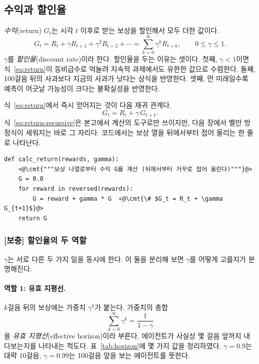 \documentclass[11pt,a4paper]{article}
\newcommand{\cmt}[1]{\textcolor{codecm}{#1}}   %
\begin{document}
\subsection{수익과 할인율}
\label{sec:gamma}

\emph{수익}(return) $G_t$는 시각 $t$ 이후로 받는 보상을 할인해서 모두 더한 값이다.
\begin{equation}
  G_t = R_t + \gamma R_{t+1} + \gamma^2 R_{t+2} + \cdots
      = \sum_{k=0}^{\infty} \gamma^k R_{t+k},
  \qquad 0 \le \gamma \le 1.
  \label{eq:return}
\end{equation}
$\gamma$를 \emph{할인율}(discount rate)이라 한다. 할인율을 두는 이유는 셋이다. 첫째, $\gamma<1$이면
식~\eqref{eq:return}이 등비급수로 억눌려 지속적 과제에서도 유한한 값으로 수렴한다. 둘째, 100걸음 뒤의
사과보다 지금의 사과가 낫다는 상식을 반영한다. 셋째, 먼 미래일수록 예측이 어긋날 가능성이 크다는
불확실성을 반영한다.

식~\eqref{eq:return}에서 즉시 얻어지는 것이 다음 재귀 관계다.
\begin{equation}
  G_t = R_t + \gamma\, G_{t+1}.
  \label{eq:return-recursive}
\end{equation}
식~\eqref{eq:return-recursive}은 본고에서 계산의 도구로만 쓰이지만, 다음 장에서 벨만 방정식이
세워지는 바로 그 자리다. 코드에서는 보상 열을 뒤에서부터 접어 올리는 한 줄로 나타난다.

\begin{lstlisting}[caption={수익의 계산 (\texttt{s01\_mdp.py})},label={lst:return}]
def calc_return(rewards, gamma):
    <@\cmt{"""보상 나열로부터 수익 G를 계산 (뒤에서부터 거꾸로 접어 올린다)"""}@>
    G = 0.0
    for reward in reversed(rewards):
        G = reward + gamma * G  <@\cmt{\# $G_t = R_t + \gamma G_{t+1}$}@>
    return G
\end{lstlisting}

\subsubsection*{[보충] 할인율의 두 역할}

$\gamma$는 서로 다른 두 가지 일을 동시에 한다. 이 둘을 분리해 보면 $\gamma$를 어떻게 고를지가
분명해진다.

\paragraph{역할 1: 유효 지평선.}
$k$걸음 뒤의 보상에는 가중치 $\gamma^k$가 붙는다. 가중치의 총합
\begin{equation}
  \sum_{k=0}^{\infty}\gamma^k = \frac{1}{1-\gamma}
  \label{eq:effective-horizon}
\end{equation}
을 \emph{유효 지평선}(effective horizon)이라 부른다. 에이전트가 사실상 몇 걸음 앞까지 내다보는지를
나타내는 척도다. 표~\ref{tab:horizon}에 몇 가지 값을 정리하였다. $\gamma=0.9$는 대략 10걸음,
$\gamma=0.99$는 100걸음 앞을 보는 에이전트를 뜻한다.
\end{document}
